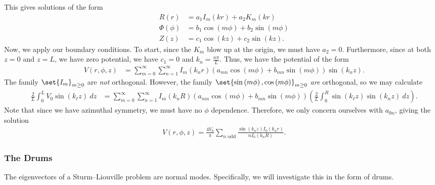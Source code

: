 \documentclass[10pt]{mypackage}
\begin{document}
\begin{example}
    This gives solutions of the form
    \begin{align*}
      R(r) &= a_1I_m\left( kr \right) + a_2K_m\left( kr \right)\\
      \Phi(\phi) &= b_1\cos\left( m\phi \right) + b_2\sin\left( m\phi \right)\\
      Z(z) &= c_1\cos\left( kz \right) + c_2\sin\left( kz \right).
    \end{align*}
    Now, we apply our boundary conditions. To start, since the $K_m$ blow up at the origin, we must have $a_2 = 0$. Furthermore, since at both $z = 0$ and $z = L$, we have zero potential, we have $c_1 = 0$ and $k_n = \frac{n\pi}{L}$. Thus, we have the potential of the form
    \begin{align*}
      V\left( r,\phi, z\right) &= \sum_{m=0}^{\infty}\sum_{n=1}^{\infty}I_m\left( k_n r \right)\left( a_{mn}\cos\left( m\phi \right) + b_{mn}\sin\left( m\phi \right) \right) \sin\left( k_n z \right).
    \end{align*}
    The family $\set{I_m}_{m\geq 0}$ are \textit{not} orthogonal. However, the family $\set{\sin\left( m\phi \right),\cos\left( m\phi \right)}_{m\geq 0}$ \textit{are} orthogonal, so we may calculate
    \begin{align*}
      \frac{2}{L} \int_{0}^{L} V_0\sin\left( k_{\ell} z \right)\:dz &= \sum_{m=0}^{\infty}\sum_{n=1}^{\infty}I_m\left( k_n R \right)\left( a_{mn}\cos\left( m\phi \right) + b_{mn}\sin\left( m\phi \right) \right)\left( \frac{2}{L} \int_{0}^{R} \sin\left( k_{\ell}z \right)\sin\left( k_{n}z \right)\:dz \right).
    \end{align*}
    Note that since we have azimuthal symmetry, we must have no $\phi$ dependence. Therefore, we only concern ourselves with $a_{0n}$, giving the solution
    \begin{align*}
      V\left( r,\phi,z \right) = \frac{4V_0}{\pi}\sum_{n\text{ odd}} \frac{\sin\left( k_n z \right)I_{0}\left( k_n r \right)}{n I_0\left( k_n R \right)}.
    \end{align*}
  \end{example}
  \subsubsection{The Drums}%
  The eigenvectors of a Sturm--Liouville problem are normal modes. Specifically, we will investigate this in the form of drums.\newline
\end{document}
